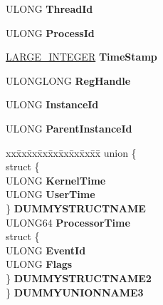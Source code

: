 \begin{DoxyCompactItemize}
\begin{tabbing}
\end{tabbing}\item 
\mbox{\label{struct___e_v_e_n_t___i_n_s_t_a_n_c_e___h_e_a_d_e_r_a984fe6ba41b860afdce05e3d26dd6f65}} 
U\+L\+O\+NG {\bfseries Thread\+Id}
\item 
\mbox{\label{struct___e_v_e_n_t___i_n_s_t_a_n_c_e___h_e_a_d_e_r_a0c4e174de2406745aa14a7de1631ebd1}} 
U\+L\+O\+NG {\bfseries Process\+Id}
\item 
\mbox{\label{struct___e_v_e_n_t___i_n_s_t_a_n_c_e___h_e_a_d_e_r_a1b405735f57c502bb3259349b2c90738}} 
\hyperlink{union___l_a_r_g_e___i_n_t_e_g_e_r}{L\+A\+R\+G\+E\+\_\+\+I\+N\+T\+E\+G\+ER} {\bfseries Time\+Stamp}
\item 
\mbox{\label{struct___e_v_e_n_t___i_n_s_t_a_n_c_e___h_e_a_d_e_r_a929beee45a3d5e129281df04a2743d5a}} 
U\+L\+O\+N\+G\+L\+O\+NG {\bfseries Reg\+Handle}
\item 
\mbox{\label{struct___e_v_e_n_t___i_n_s_t_a_n_c_e___h_e_a_d_e_r_aa0c901110422d925a23afb83888334ce}} 
U\+L\+O\+NG {\bfseries Instance\+Id}
\item 
\mbox{\label{struct___e_v_e_n_t___i_n_s_t_a_n_c_e___h_e_a_d_e_r_a2719e33d6823400171b48d9833b42572}} 
U\+L\+O\+NG {\bfseries Parent\+Instance\+Id}
\item 
\mbox{\label{struct___e_v_e_n_t___i_n_s_t_a_n_c_e___h_e_a_d_e_r_aef33a6cc8f0e4259e44aac406312cfa1}} 
\begin{tabbing}
xx\=xx\=xx\=xx\=xx\=xx\=xx\=xx\=xx\=\kill
union \{\\
\>struct \{\\
\>\>ULONG {\bfseries KernelTime}\\
\>\>ULONG {\bfseries UserTime}\\
\>\} {\bfseries DUMMYSTRUCTNAME}\\
\>ULONG64 {\bfseries ProcessorTime}\\
\>struct \{\\
\>\>ULONG {\bfseries EventId}\\
\>\>ULONG {\bfseries Flags}\\
\>\} {\bfseries DUMMYSTRUCTNAME2}\\
\} {\bfseries DUMMYUNIONNAME3}\\


\end{tabbing}
\end{DoxyCompactItemize}
